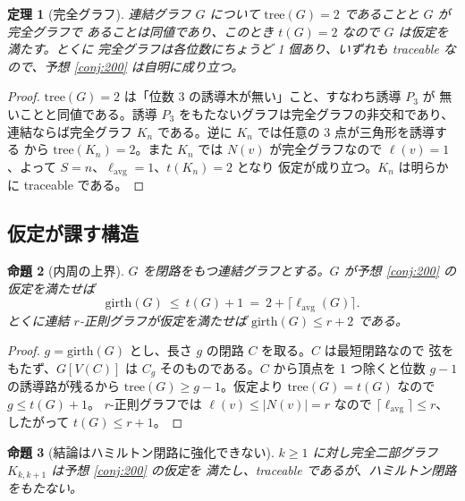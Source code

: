 \documentclass[paper=a4,fontsize=10.5pt,jafontsize=10.5pt]{jlreq}
\theoremstyle{plain}
\newtheorem{theorem}{定理}[section]
\newtheorem{proposition}[theorem]{命題}
\theoremstyle{definition}
\begin{document}
\begin{theorem}[完全グラフ]\label{thm:kn}
連結グラフ $G$ について $\mathrm{tree}(G) = 2$ であることと $G$ が完全グラフで
あることは同値であり、このとき $t(G) = 2$ なので $G$ は仮定を満たす。とくに
完全グラフは各位数にちょうど 1 個あり、いずれも traceable なので、予想
\ref{conj:200} は自明に成り立つ。
\end{theorem}

\begin{proof}
$\mathrm{tree}(G) = 2$ は「位数 3 の誘導木が無い」こと、すなわち誘導 $P_3$ が
無いことと同値である。誘導 $P_3$ をもたないグラフは完全グラフの非交和であり、
連結ならば完全グラフ $K_n$ である。逆に $K_n$ では任意の 3 点が三角形を誘導する
から $\mathrm{tree}(K_n) = 2$。また $K_n$ では $N(v)$ が完全グラフなので
$\ell(v) = 1$、よって $S = n$、$\ell_{\mathrm{avg}} = 1$、$t(K_n) = 2$ となり
仮定が成り立つ。$K_n$ は明らかに traceable である。
\end{proof}

\subsection{仮定が課す構造}

\begin{proposition}[内周の上界]\label{prop:girth}
$G$ を閉路をもつ連結グラフとする。$G$ が予想 \ref{conj:200} の仮定を満たせば
\[ \mathrm{girth}(G) \ \le \ t(G) + 1
   \ = \ 2 + \lceil \ell_{\mathrm{avg}}(G) \rceil . \]
とくに連結 $r$-正則グラフが仮定を満たせば $\mathrm{girth}(G) \le r + 2$ である。
\end{proposition}

\begin{proof}
$g = \mathrm{girth}(G)$ とし、長さ $g$ の閉路 $C$ を取る。$C$ は最短閉路なので
弦をもたず、$G[V(C)]$ は $C_g$ そのものである。$C$ から頂点を 1 つ除くと位数
$g-1$ の誘導路が残るから $\mathrm{tree}(G) \ge g - 1$。仮定より
$\mathrm{tree}(G) = t(G)$ なので $g \le t(G) + 1$。
$r$-正則グラフでは $\ell(v) \le |N(v)| = r$ なので
$\lceil \ell_{\mathrm{avg}} \rceil \le r$、したがって $t(G) \le r+1$。
\end{proof}

\begin{proposition}[結論はハミルトン閉路に強化できない]\label{prop:sharp}
$k \ge 1$ に対し完全二部グラフ $K_{k,k+1}$ は予想 \ref{conj:200} の仮定を
満たし、traceable であるが、ハミルトン閉路をもたない。
\end{proposition}
\end{document}
